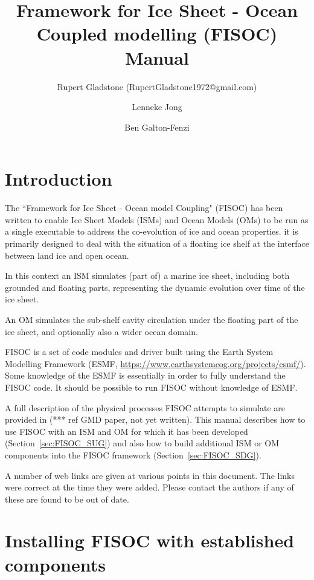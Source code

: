 \documentclass[12pt]{article}
\begin{document}
\title{Framework for Ice Sheet - Ocean Coupled modelling (FISOC) Manual}
\author{Rupert Gladstone (RupertGladstone1972@gmail.com) \and Lenneke Jong \and Ben Galton-Fenzi}
\maketitle

\newpage 
\tableofcontents
\newpage 

\section{Introduction}

The ``Framework for Ice Sheet - Ocean model Coupling" (FISOC) has been written to enable Ice Sheet Models 
(ISMs) and Ocean Models (OMs) to be run as a single executable to address the co-evolution of ice and ocean 
properties.  it is primarily designed to deal with the situation of a floating ice shelf at the interface 
between land ice and open ocean.

In this context an ISM simulates (part of) a marine ice sheet, including both grounded and floating parts, 
representing the dynamic evolution over time of the ice sheet.

An OM simulates the sub-shelf cavity circulation under the floating part of the ice sheet, and optionally also 
a wider ocean domain.

FISOC is a set of code modules and driver built using the Earth System Modelling Framework (ESMF, 
\url{https://www.earthsystemcog.org/projects/esmf/}). 
Some knowledge of the ESMF is essentially in order to fully understand the FISOC code.  It should 
be possible to run FISOC without knowledge of ESMF.

A full description of the physical processes FISOC attempts to simulate are provided in (***
ref GMD paper, not yet written).  
This manual describes how to use FISOC with an ISM and OM for which it has been 
developed (Section~\ref{sec:FISOC_SUG}) and also how to build additional ISM or OM components 
into the FISOC framework (Section~\ref{sec:FISOC_SDG}).

A number of web links are given at various points in this document.  
The links were correct at the time they were added. 
Please contact the authors if any of these are found to be out of date. 




\section{Installing FISOC with established components}
\label{sec:FISOC_install}
\end{document}
